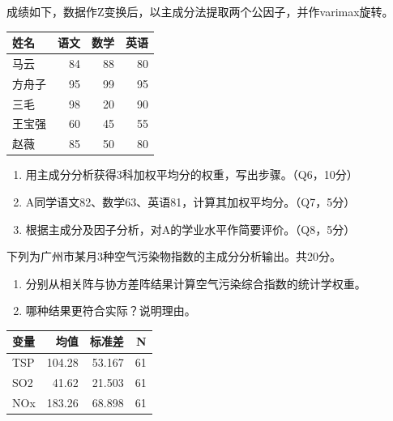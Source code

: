 \par\addvspace{6pt}\noindent\begin{minipage}{\linewidth}


成绩如下，数据作Z变换后，以主成分法提取两个公因子，并作varimax旋转。

\begin{center}\small\setlength{\tabcolsep}{4pt}\renewcommand{\arraystretch}{1.18}\begin{tabular}{@{}lrrr@{}}
\toprule
姓名 & 语文 & 数学 & 英语 \\
\midrule

马云 & 84 & 88 & 80 \\
方舟子 & 95 & 99 & 95 \\
三毛 & 98 & 20 & 90 \\
王宝强 & 60 & 45 & 55 \\
赵薇 & 85 & 50 & 80 \\
\bottomrule\end{tabular}\end{center}

\begin{enumerate}
\def\labelenumi{\arabic{enumi}.}
\tightlist
\item
  用主成分分析获得3科加权平均分的权重，写出步骤。（Q6，10分）
\item
  A同学语文82、数学63、英语81，计算其加权平均分。（Q7，5分）
\item
  根据主成分及因子分析，对A的学业水平作简要评价。（Q8，5分）
\end{enumerate}



\end{minipage}\par\vspace{4pt}


下列为广州市某月3种空气污染物指数的主成分分析输出。共20分。

\begin{enumerate}
\def\labelenumi{\arabic{enumi}.}
\tightlist
\item
  分别从相关阵与协方差阵结果计算空气污染综合指数的统计学权重。
\item
  哪种结果更符合实际？说明理由。
\end{enumerate}

\begin{center}\small\setlength{\tabcolsep}{4pt}\renewcommand{\arraystretch}{1.18}\begin{tabular}{@{}lrrr@{}}
\toprule
变量 & 均值 & 标准差 & N \\
\midrule

TSP & 104.28 & 53.167 & 61 \\
SO2 & 41.62 & 21.503 & 61 \\
NOx & 183.26 & 68.898 & 61 \\
\bottomrule\end{tabular}\end{center}

